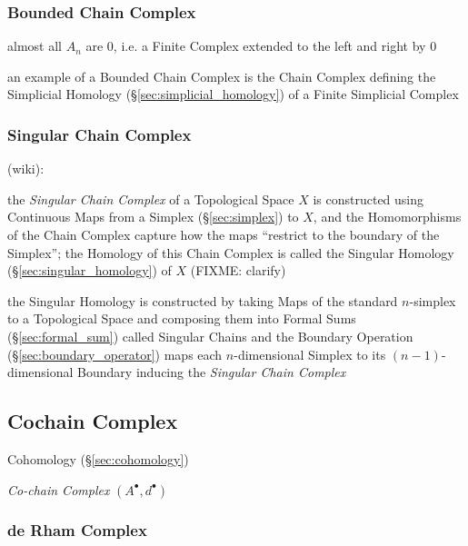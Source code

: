 \subsubsection{Bounded Chain Complex}\label{sec:bounded_chain_complex}

almost all $A_n$ are $0$, i.e. a Finite Complex extended to the left and right
by $0$

an example of a Bounded Chain Complex is the Chain Complex defining the
Simplicial Homology (\S\ref{sec:simplicial_homology}) of a Finite Simplicial
Complex



\subsubsection{Singular Chain Complex}\label{sec:singular_chain_complex}

(wiki):

the \emph{Singular Chain Complex} of a Topological Space $X$ is constructed
using Continuous Maps from a Simplex (\S\ref{sec:simplex}) to $X$, and the
Homomorphisms of the Chain Complex capture how the maps ``restrict to the
boundary of the Simplex''; the Homology of this Chain Complex is called the
Singular Homology (\S\ref{sec:singular_homology}) of $X$ (FIXME: clarify)

the Singular Homology is constructed by taking Maps of the standard $n$-simplex
to a Topological Space and composing them into Formal
Sums (\S\ref{sec:formal_sum}) called Singular Chains and the Boundary Operation
(\S\ref{sec:boundary_operator}) maps each $n$-dimensional Simplex to its
$(n-1)$-dimensional Boundary inducing the \emph{Singular Chain Complex}



\subsection{Cochain Complex}\label{sec:cochain_complex}

\fist Cohomology (\S\ref{sec:cohomology})

\emph{Co-chain Complex} $(A^\bullet, d^\bullet)$



\subsubsection{de Rham Complex}\label{sec:derham_complex}


